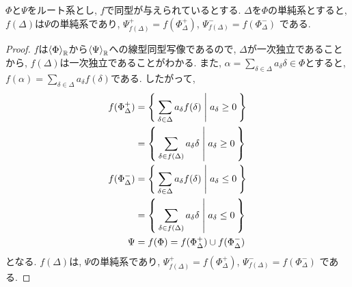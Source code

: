 \begin{prop}
  $\Phi$と$\Psi$をルート系とし,
  $f$で同型が与えられているとする.
  $\Delta$を$\Phi$の単純系とすると,
  $f(\Delta)$は$\Psi$の単純系であり,
  $\Psi^{+}_{f(\Delta)}=f(\Phi^+_{\Delta})$,
  $\Psi^{-}_{f(\Delta)}=f(\Phi^-_{\Delta})$
  である.
\end{prop}
\begin{proof}
  $f$は$\Braket{\Phi}_{\mathbb{R}}$から$\Braket{\Psi}_{\mathbb{R}}$への線型同型写像であるので,
  $\Delta$が一次独立であることから,
  $f(\Delta)$は一次独立であることがわかる.
  また,
  $\alpha=\sum_{\delta\in\Delta}a_\delta \delta\in \Phi$とすると,
  $f(\alpha)=\sum_{\delta\in\Delta}a_\delta f(\delta)$である.
  したがって,
  \begin{align*}
    f(\Phi^+_{\Delta})
    &=\Set{\sum_{\delta\in\Delta}a_\delta f(\delta)|a_\delta\geq 0}\\
    &=\Set{\sum_{\delta\in f(\Delta)}a_{\delta} \delta|a_{\delta}\geq 0}\\
    f(\Phi^-_{\Delta})
    &=\Set{\sum_{\delta\in\Delta}a_\delta f(\delta)|a_\delta\leq 0}\\
    &=\Set{\sum_{\delta\in f(\Delta)}a_{\delta} \delta|a_{\delta}\leq 0}\\
    \Psi&=f(\Phi)=f(\Phi^+_{\Delta})\cup f(\Phi^-_{\Delta})
  \end{align*}
  となる.
  $f(\Delta)$は, $\Psi$の単純系であり,
  $\Psi^{+}_{f(\Delta)}=f(\Phi^+_{\Delta})$,
  $\Psi^{-}_{f(\Delta)}=f(\Phi^-_{\Delta})$
  である.
\end{proof}


